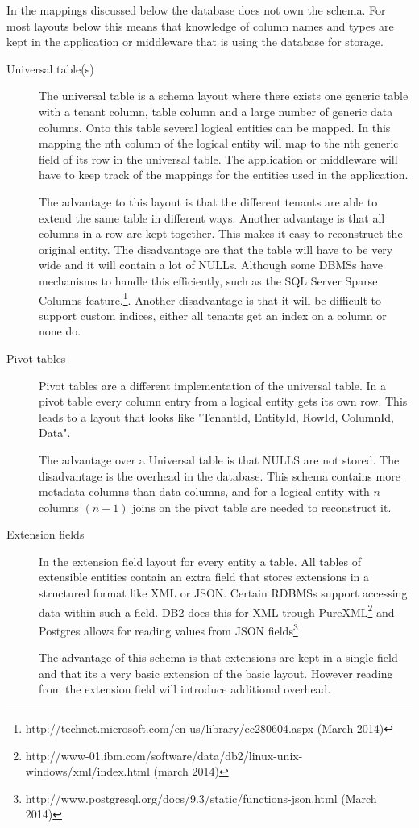 In the mappings discussed below the database does not own the schema. 
For most layouts below this means that knowledge of column names and types are kept in the application or middleware that is using the database for storage. 
\begin{description}
	\item[Universal table(s)]
		The universal table is a schema layout where there exists one generic table with a tenant column, table column and a large number of generic data columns.
		Onto this table several logical entities can be mapped.
		In this mapping the nth column of the logical entity will map to the nth generic field of its row in the universal table.
		The application or middleware will have to keep track of the mappings for the entities used in the application.

		The advantage to this layout is that the different tenants are able to extend the same table in different ways. 
		Another advantage is that all columns in a row are kept together. 
		This makes it easy to reconstruct the original entity.
		The disadvantage are that the table will have to be very wide and it will contain a lot of NULLs. 
		Although some \acp{DBMS} have mechanisms to handle this efficiently, such as the SQL Server Sparse Columns feature.\footnote{http://technet.microsoft.com/en-us/library/cc280604.aspx (March 2014)}.
		Another disadvantage is that it will be difficult to support custom indices, either all tenants get an index on a column or none do.~\cite{aulbach2008multi}
	\item[Pivot tables]
		Pivot tables are a different implementation of the universal table.
		In a pivot table every column entry from a logical entity gets its own row. 
		This leads to a layout that looks like "TenantId, EntityId, RowId, ColumnId, Data".

		The advantage over a Universal table is that NULLS are not stored.
		The disadvantage is the overhead in the database. 
		This schema contains more metadata columns than data columns, and for a logical entity with $n$ columns $(n-1)$ joins on the pivot table are needed to reconstruct it.~\cite{aulbach2008multi}
	\item[Extension fields]
		In the extension field layout for every entity a table.
		All tables of extensible entities contain an extra field that stores extensions in a structured format like XML or JSON.
		Certain \acp{RDBMS} support accessing data within such a field. 
		DB2 does this for XML trough PureXML\footnote{http://www-01.ibm.com/software/data/db2/linux-unix-windows/xml/index.html (march 2014)} and Postgres allows for reading values from JSON fields\footnote{http://www.postgresql.org/docs/9.3/static/functions-json.html (March 2014)}

		The advantage of this schema is that extensions are kept in a single field and that its a very basic extension of the basic layout.
		However reading from the extension field will introduce additional overhead.~\cite{aulbach2009comparison}
\end{description}

